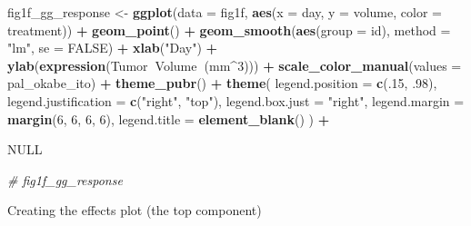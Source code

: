 \documentclass[]{book}
\newenvironment{Shaded}{\begin{snugshade}}{\end{snugshade}}
\newcommand{\CommentTok}[1]{\textcolor[rgb]{0.56,0.35,0.01}{\textit{#1}}}
\newcommand{\DataTypeTok}[1]{\textcolor[rgb]{0.13,0.29,0.53}{#1}}
\newcommand{\DecValTok}[1]{\textcolor[rgb]{0.00,0.00,0.81}{#1}}
\newcommand{\FloatTok}[1]{\textcolor[rgb]{0.00,0.00,0.81}{#1}}
\newcommand{\KeywordTok}[1]{\textcolor[rgb]{0.13,0.29,0.53}{\textbf{#1}}}
\newcommand{\NormalTok}[1]{#1}
\newcommand{\OperatorTok}[1]{\textcolor[rgb]{0.81,0.36,0.00}{\textbf{#1}}}
\newcommand{\OtherTok}[1]{\textcolor[rgb]{0.56,0.35,0.01}{#1}}
\newcommand{\StringTok}[1]{\textcolor[rgb]{0.31,0.60,0.02}{#1}}
\begin{document}
\begin{Shaded}
\begin{Highlighting}[]
\NormalTok{fig1f_gg_response <-}\StringTok{ }\KeywordTok{ggplot}\NormalTok{(}\DataTypeTok{data =}\NormalTok{ fig1f,}
                      \KeywordTok{aes}\NormalTok{(}\DataTypeTok{x =}\NormalTok{ day, }\DataTypeTok{y =}\NormalTok{ volume, }\DataTypeTok{color =}\NormalTok{ treatment)) }\OperatorTok{+}
\StringTok{  }\KeywordTok{geom_point}\NormalTok{() }\OperatorTok{+}
\StringTok{  }\KeywordTok{geom_smooth}\NormalTok{(}\KeywordTok{aes}\NormalTok{(}\DataTypeTok{group =}\NormalTok{ id), }\DataTypeTok{method =} \StringTok{"lm"}\NormalTok{, }\DataTypeTok{se =} \OtherTok{FALSE}\NormalTok{) }\OperatorTok{+}
\StringTok{  }\KeywordTok{xlab}\NormalTok{(}\StringTok{"Day"}\NormalTok{) }\OperatorTok{+}
\StringTok{  }\KeywordTok{ylab}\NormalTok{(}\KeywordTok{expression}\NormalTok{(Tumor}\OperatorTok{~}\NormalTok{Volume}\OperatorTok{~}\NormalTok{(mm}\OperatorTok{^}\DecValTok{3}\NormalTok{))) }\OperatorTok{+}
\StringTok{  }\KeywordTok{scale_color_manual}\NormalTok{(}\DataTypeTok{values =}\NormalTok{ pal_okabe_ito) }\OperatorTok{+}
\StringTok{  }\KeywordTok{theme_pubr}\NormalTok{() }\OperatorTok{+}
\StringTok{  }\KeywordTok{theme}\NormalTok{(}
    \DataTypeTok{legend.position =} \KeywordTok{c}\NormalTok{(.}\DecValTok{15}\NormalTok{, }\FloatTok{.98}\NormalTok{),}
    \DataTypeTok{legend.justification =} \KeywordTok{c}\NormalTok{(}\StringTok{"right"}\NormalTok{, }\StringTok{"top"}\NormalTok{),}
    \DataTypeTok{legend.box.just =} \StringTok{"right"}\NormalTok{,}
    \DataTypeTok{legend.margin =} \KeywordTok{margin}\NormalTok{(}\DecValTok{6}\NormalTok{, }\DecValTok{6}\NormalTok{, }\DecValTok{6}\NormalTok{, }\DecValTok{6}\NormalTok{),}
    \DataTypeTok{legend.title =} \KeywordTok{element_blank}\NormalTok{()}
\NormalTok{    ) }\OperatorTok{+}

\StringTok{  }\OtherTok{NULL}

\CommentTok{# fig1f_gg_response}
\end{Highlighting}
\end{Shaded}

Creating the effects plot (the top component)
\end{document}
